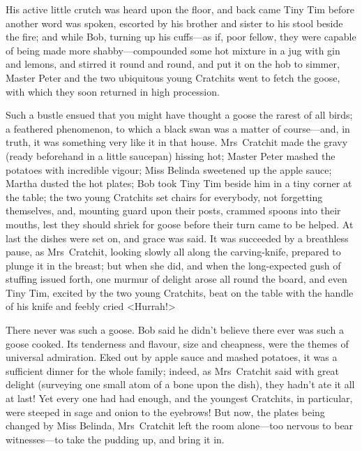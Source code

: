 His active little crutch was heard upon the floor, and back came Tiny Tim before another word was spoken, escorted by his brother and sister to his stool beside the fire; and while Bob, turning up his cuffs—as if, poor fellow, they were capable of being made more shabby—compounded some hot mixture in a jug with gin and lemons, and stirred it round and round, and put it on the hob to simmer, Master Peter and the two ubiquitous young Cratchits went to fetch the goose, with which they soon returned in high procession.



Such a bustle ensued that you might have thought a goose the rarest of all birds; a feathered phenomenon, to which a black swan was a matter of course—and, in truth, it was something very like it in that house. Mrs~Cratchit made the gravy (ready beforehand in a little saucepan) hissing hot; Master Peter mashed the potatoes with incredible vigour; Miss Belinda sweetened up the apple sauce; Martha dusted the hot plates; Bob took Tiny Tim beside him in a tiny corner at the table; the two young Cratchits set chairs for everybody, not forgetting themselves, and, mounting guard upon their posts, crammed spoons into their mouths, lest they should shriek for goose before their turn came to be helped. At last the dishes were set on, and grace was said. It was succeeded by a breathless pause, as Mrs~Cratchit, looking slowly all along the carving-knife, prepared to plunge it in the breast; but when she did, and when the long-expected gush of stuffing issued forth, one murmur of delight arose all round the board, and even Tiny Tim, excited by the two young Cratchits, beat on the table with the handle of his knife and feebly cried <Hurrah!>



There never was such a goose. Bob said he didn't believe there ever was such a goose cooked. Its tenderness and flavour, size and cheapness, were the themes of universal admiration. Eked out by apple sauce and mashed potatoes, it was a sufficient dinner for the whole family; indeed, as Mrs~Cratchit said with great delight (surveying one small atom of a bone upon the dish), they hadn't ate it all at last! Yet every one had had enough, and the youngest Cratchits, in particular, were steeped in sage and onion to the eyebrows! But now, the plates being changed by Miss Belinda, Mrs~Cratchit left the room alone—too nervous to bear witnesses—to take the pudding up, and bring it in.



